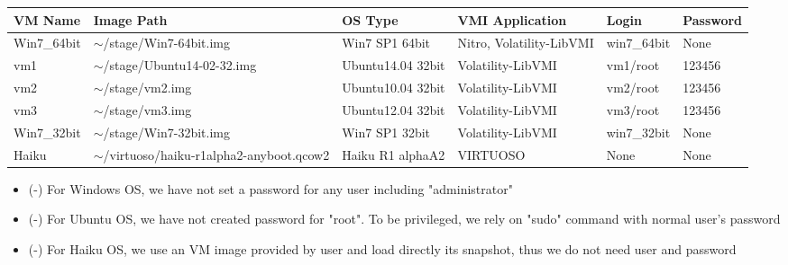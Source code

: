 \documentclass[11pt, oneside]{Thesis} %
\begin{document}
\clearpage %



\begin{center}
    \begin{tabular}{| p{2cm} |p{3cm} | p{2cm} | p{2cm} |p{2cm} |p{2cm}|}
    \hline
    VM Name & Image Path & OS Type & VMI Application & Login & Password  \\ 
    \hline
    Win7\_64bit & $\sim$/stage/Win7-64bit.img & Win7 SP1 64bit & Nitro, Volatility-LibVMI & win7\_64bit & None\\ 
    \hline
    vm1 & $\sim$/stage/Ubuntu14-02-32.img & Ubuntu14.04 32bit &Volatility-LibVMI & vm1/root & 123456\\
    \hline
    vm2 & $\sim$/stage/vm2.img & Ubuntu10.04 32bit &Volatility-LibVMI & vm2/root & 123456\\
    \hline
    vm3 & $\sim$/stage/vm3.img & Ubuntu12.04 32bit &Volatility-LibVMI & vm3/root & 123456\\
    \hline
    Win7\_32bit & $\sim$/stage/Win7-32bit.img & Win7 SP1 32bit & Volatility-LibVMI & win7\_32bit & None\\
    \hline
    Haiku & $\sim$/virtuoso/haiku-r1alpha2-anyboot.qcow2 & Haiku R1 alphaA2 & VIRTUOSO & None & None\\ 
    \hline


    \end{tabular}
    \begin{itemize}
     \item(-) For Windows OS, we have not set a password for any user including "administrator"
     \item(-) For Ubuntu OS, we have not created password for "root". To be privileged, we rely on "sudo" command with normal user's password
     \item(-) For Haiku OS, we use an VM image provided by user and load directly its snapshot, thus we do not need user and password 
    \end{itemize}
\end{center}


\end{document}
